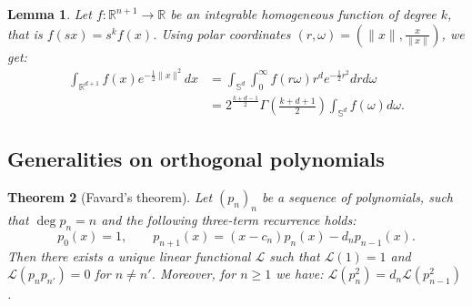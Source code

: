\documentclass{amsart}
\renewcommand{\L}{\mathcal{L}}
\newcommand{\R}{\mathbb{R}}
\renewcommand{\S}{\mathbb{S}}
\theoremstyle{plain}
\newtheorem{theorem}{Theorem}[section]
\newtheorem{lemma}[theorem]{Lemma}
\theoremstyle{definition}
\theoremstyle{remark}
\begin{document}
\begin{lemma}\label{homosphere}
Let $f:\R^{n+1}\rightarrow\R$ be an integrable homogeneous function of degree $k$, that is $f(sx) = s^kf(x)$. Using polar coordinates $(r,\omega) = (\|x\|,\frac{x}{\|x\|})$, we get:
\begin{align*}
\int_{\R^{d+1}}f(x)e^{-\frac{1}{2}\|x\|^2} dx &= \int_{\S^d}\!\int_0^\infty\! f(r\omega) r^d e^{-\frac{1}{2}r^2}dr d\omega \\
&= 2^{\frac{k+d-1}{2}}\Gamma\left(\tfrac{k+d+1}{2}\right)\int_{\S^d}f(\omega)d\omega .
\end{align*}
\end{lemma}


\subsection{Generalities on orthogonal polynomials}
\begin{theorem}[Favard's theorem] \label{favard}
Let $(p_n)_n$ be a sequence of polynomials, such that $\deg p_n =n$ and the following three-term recurrence holds:
$$p_0(x) = 1,\qquad  p_{n+1}(x) = (x-c_n)p_n(x) - d_np_{n-1}(x).
$$
Then there exists a unique linear functional $\L$ such that $\L(1)=1$ and $\L(p_np_{n'})=0$ for $n\neq n'$. Moreover, for $n\geq 1$ we have: $\L(p_n^2) = d_n\L(p_{n-1}^2)$.
\end{theorem}
\end{document}
